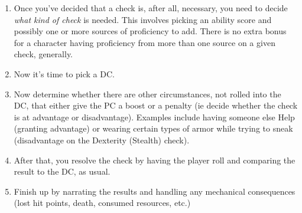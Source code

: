 \documentclass[10pt,twoside,openany,bg=none]{dndbook}
\begin{document}
\begin{enumerate}
\begin{enumerate}
        \item Are you ok with the outcomes of both success and failure? If not, simply narrate whichever one you \textit{are} ok with or change the outcome to be something you can be ok with. In this case, we don't want to let the dice or the rules override our own knowledge of what is fun. \textbf{CAUTION:} Using this to force your preferred narrative denies players their agency and is one form of railroading. This lever is best only pulled when something critically un-fun (as judged by your party) would happen. For many parties, an example might be an ignominious, pointless death for something simple. Instead of a party member falling to their death on a failed Dexterity (Acrobatics) check to land safely from a risky jump (narratively slipping off the edge of a huge cliff), instead they might succeed at balancing (success on the check) at a cost: maybe they lose something from their pack, take an injury (mechanically implemented by a level of exhaustion, etc), or something like that. Similarly, if a party would get deadlocked on a quest if they failed an Intelligence (Investigation) check and not be able to make any more progress, don't have them make that check. They simply find the needed information. Find a different way of testing them.
        \item Is this something the person is doing routinely, rather than a focused effort? Use a passive check (10 + the relevant modifiers) instead of an active one. The most common use of this is Wisdom (Perception) to avoid being surprised.
    \end{enumerate}
    \item Once you've decided that a check is, after all, necessary, you need to decide \textit{what kind of check} is needed. This involves picking an ability score and possibly one or more sources of proficiency to add. There is no extra bonus for a character having proficiency from more than one source on a given check, generally.
    \item Now it's time to pick a DC.
    \item Now determine whether there are other circumstances, not rolled into the DC, that either give the PC a boost or a penalty (ie decide whether the check is at advantage or disadvantage). Examples include having someone else Help (granting advantage) or wearing certain types of armor while trying to sneak (disadvantage on the Dexterity (Stealth) check).
    \item After that, you resolve the check by having the player roll and comparing the result to the DC, as usual.
    \item Finish up by narrating the results and handling any mechanical consequences (lost hit points, death, consumed resources, etc.)
\end{enumerate}
\end{document}
